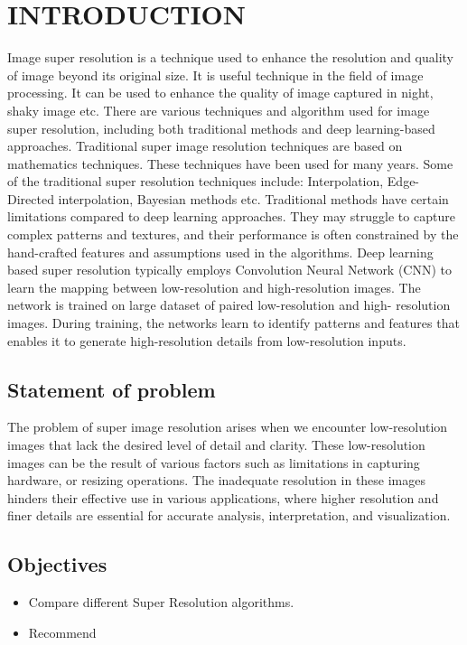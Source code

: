 \newpage
{}
\section{INTRODUCTION}
Image super resolution is a technique used to enhance the resolution and quality of
image beyond its original size. It is useful technique in the field of image processing. It
can be used to enhance the quality of image captured in night, shaky image etc. There
are various techniques and algorithm used for image super resolution, including both
traditional methods and deep learning-based approaches. Traditional super image
resolution techniques are based on mathematics techniques. These techniques have
been used for many years. Some of the traditional super resolution techniques include:
Interpolation, Edge-Directed interpolation, Bayesian methods etc. Traditional methods
have certain limitations compared to deep learning approaches. They may struggle to
capture complex patterns and textures, and their performance is often constrained by
the hand-crafted features and assumptions used in the algorithms.
Deep learning based super resolution typically employs Convolution Neural
Network (CNN) to learn the mapping between low-resolution and high-resolution
images. The network is trained on large dataset of paired low-resolution and high-
resolution images. During training, the networks learn to identify patterns and features
that enables it to generate high-resolution details from low-resolution inputs.


\subsection{Statement of problem}
The problem of super image resolution arises when we encounter low-resolution images
that lack the desired level of detail and clarity. These low-resolution images can be the
result of various factors such as limitations in capturing hardware, or resizing
operations. The inadequate resolution in these images hinders their effective use in
various applications, where higher resolution and finer details are essential for accurate
analysis, interpretation, and visualization.

\subsection{Objectives} 
\begin{itemize}
    \item Compare different Super Resolution algorithms.
    \item Recommend 
\end{itemize}

